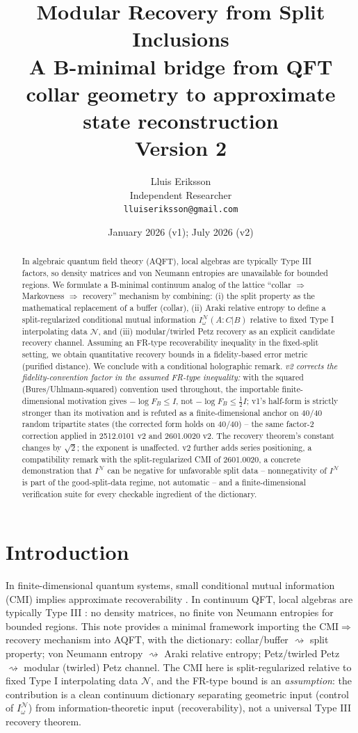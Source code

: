 \documentclass[11pt]{article}
\title{Modular Recovery from Split Inclusions\\
{\large A B-minimal bridge from QFT collar geometry to approximate state
reconstruction}\\
{\normalsize Version 2}}
\author{Lluis Eriksson\\ Independent Researcher\\ \texttt{lluiseriksson@gmail.com}}
\date{January 2026 (v1); July 2026 (v2)}
\theoremstyle{remark}
\begin{document}
\maketitle

\begin{abstract}
In algebraic quantum field theory (AQFT), local algebras are typically
Type III factors, so density matrices and von Neumann entropies are
unavailable for bounded regions. We formulate a B-minimal continuum analog
of the lattice ``collar $\Rightarrow$ Markovness $\Rightarrow$ recovery''
mechanism by combining: (i) the split property as the mathematical
replacement of a buffer (collar), (ii) Araki relative entropy to define a
split-regularized conditional mutual information $I^{\mathcal{N}}_\omega
(A:C|B)$ relative to fixed Type I interpolating data $\mathcal{N}$, and
(iii) modular/twirled Petz recovery as an explicit candidate recovery
channel. Assuming an FR-type recoverability inequality in the fixed-split
setting, we obtain quantitative recovery bounds in a fidelity-based error
metric (purified distance). We conclude with a conditional holographic
remark. \emph{v2 corrects the fidelity-convention factor in the assumed
FR-type inequality:} with the squared (Bures/Uhlmann-squared) convention
used throughout, the importable finite-dimensional motivation gives
$-\log F_B \le I$, not $-\log F_B \le \tfrac12 I$; v1's half-form is
strictly stronger than its motivation and is refuted as a
finite-dimensional anchor on 40/40 random tripartite states (the corrected
form holds on 40/40) -- the same factor-2 correction applied in 2512.0101
v2 and 2601.0020 v2. The recovery theorem's constant changes by $\sqrt2$;
the exponent is unaffected. v2 further adds series positioning, a
compatibility remark with the split-regularized CMI of 2601.0020, a
concrete demonstration that $I^{\mathcal{N}}$ can be negative for
unfavorable split data -- nonnegativity of $I^{\mathcal{N}}$ is part of
the good-split-data regime, not automatic -- and a finite-dimensional
verification suite for every checkable ingredient of the dictionary.
\end{abstract}

\section{Introduction}
In finite-dimensional quantum systems, small conditional mutual
information (CMI) implies approximate recoverability \cite{FR}. In
continuum QFT, local algebras are typically Type III \cite{Haag,
Yngvason}: no density matrices, no finite von Neumann entropies for
bounded regions. This note provides a minimal framework importing the
CMI$\Rightarrow$recovery mechanism into AQFT, with the dictionary:
collar/buffer $\rightsquigarrow$ split property; von Neumann entropy
$\rightsquigarrow$ Araki relative entropy; Petz/twirled Petz
$\rightsquigarrow$ modular (twirled) Petz channel. The CMI here is
split-regularized relative to fixed Type I interpolating data
$\mathcal{N}$, and the FR-type bound is an \emph{assumption}: the
contribution is a clean continuum dictionary separating geometric input
(control of $I^{\mathcal{N}}_\omega$) from information-theoretic input
(recoverability), not a universal Type III recovery theorem.
\end{document}
